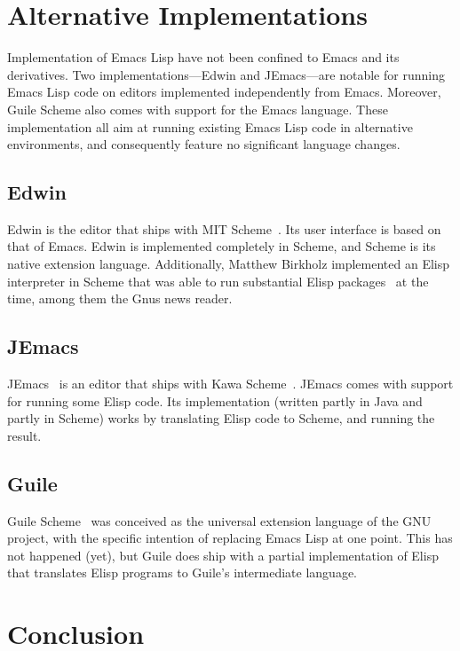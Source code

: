 \documentclass[format=acmsmall, review=false, screen=true]{acmart}
\newcommand \Elisp {Elisp}
\begin{document}
\section{Alternative Implementations}
\label{sec:alternative-implementations}

Implementation of Emacs Lisp have not been confined to Emacs and its
derivatives.  Two implementations---Edwin and JEmacs---are notable for
running Emacs Lisp code on editors implemented independently from
Emacs.  Moreover, Guile Scheme also comes with support for the Emacs
language.  These implementation all aim at running existing Emacs Lisp
code in alternative environments, and consequently feature no
significant language changes.

\subsection{Edwin}

Edwin is the editor that ships with MIT Scheme~\cite{MITScheme2014}.
Its user interface is based on that of Emacs.  Edwin is implemented
completely in Scheme, and Scheme is its native extension language.
Additionally, Matthew Birkholz implemented an \Elisp{} interpreter
in Scheme that was able to run substantial \Elisp{}
packages~\cite{Birkholz1993} at the time, among them the Gnus news reader.

\subsection{JEmacs}

JEmacs~\cite{Bothner2001} is an editor that ships with Kawa
Scheme~\cite{KawaScheme}.  JEmacs comes with support for running some
\Elisp{} code.  Its implementation (written partly in Java and
partly in Scheme) works by translating \Elisp{} code to Scheme, and
running the result.

\subsection{Guile}

Guile Scheme~\cite{Guile2018} was conceived as the universal extension
language of the GNU project, with the specific intention of replacing
Emacs Lisp at one point.  This has not happened (yet), but Guile does
ship with a partial implementation of \Elisp{} that translates
\Elisp{} programs to Guile's intermediate language.

\section{Conclusion}
\label{sec:conclusion}
\end{document}
